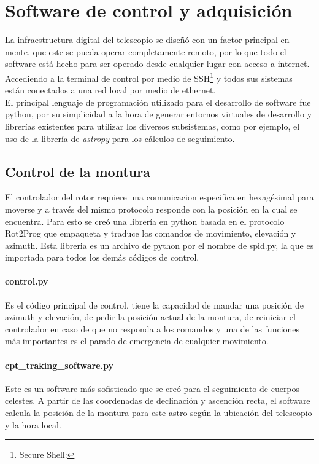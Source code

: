 \section{Software de control y adquisición} \label{sec:software}

La infraestructura digital del telescopio se diseñó con un factor principal en mente, que este se pueda operar completamente remoto, por lo que todo el software está hecho para ser operado desde cualquier lugar con acceso a internet. Accediendo a la terminal de control por medio de SSH\footnote{Secure Shell: } y todos sus sistemas están conectados a una red local por medio de ethernet.\\

El principal lenguaje de programación utilizado para el desarrollo de software fue python, por su simplicidad a la hora de generar entornos virtuales de desarrollo y librerías existentes para utilizar los diversos subsistemas, como por ejemplo, el uso de la librería de \textit{astropy} para los cálculos de seguimiento.\\

\subsection{Control de la montura}

El controlador del rotor requiere una comunicacion especifica en hexagésimal para moverse y a través del mismo protocolo responde con la posición en la cual se encuentra. Para esto se creó una librería en python basada en el protocolo Rot2Prog \cite{Rot2Prog} que empaqueta y traduce los comandos de movimiento, elevación y azimuth. Esta libreria es un archivo de python por el nombre de spid.py, la que es importada para todos los demás códigos de control.\\

\paragraph{control.py} Es el código principal de control, tiene la capacidad de mandar una posición de azimuth y elevación, de pedir la posición actual de la montura, de reiniciar el controlador en caso de que no responda a los comandos y una de las funciones más importantes es el parado de emergencia de cualquier movimiento.\\

\paragraph{cpt\_traking\_software.py} Este es un software más sofisticado que se creó para el seguimiento de cuerpos celestes. A partir de las coordenadas de declinación y ascención recta, el software calcula la posición de la montura para este astro según la ubicación del telescopio y la hora local.\\

